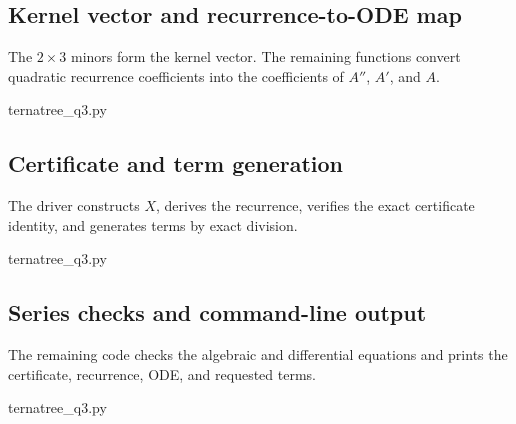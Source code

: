 \documentclass[11pt,fleqn]{article}
\theoremstyle{plain}
\begin{document}
	\clearpage
	\subsection{Kernel vector and recurrence-to-ODE map}
	The $2\times3$ minors form the kernel vector.  The remaining functions convert
	quadratic recurrence coefficients into the coefficients of $A''$, $A'$, and
	$A$.
	\par\medskip\noindent
	\begin{minipage}[t]{\textwidth}
	
	{ternatree_q3.py}
	\end{minipage}
	
	\clearpage
	\subsection{Certificate and term generation}
	The driver constructs $X$, derives the recurrence, verifies the exact
	certificate identity, and generates terms by exact division.
	\par\medskip\noindent
	\begin{minipage}[t]{\textwidth}
	
	{ternatree_q3.py}
	\end{minipage}

	\clearpage
	\subsection{Series checks and command-line output}
	The remaining code checks the algebraic and differential equations and
	prints the certificate, recurrence, ODE, and requested terms.
	\par\medskip\noindent
	\begin{minipage}[t]{\textwidth}
	
	{ternatree_q3.py}
	\end{minipage}
	
\end{document}
